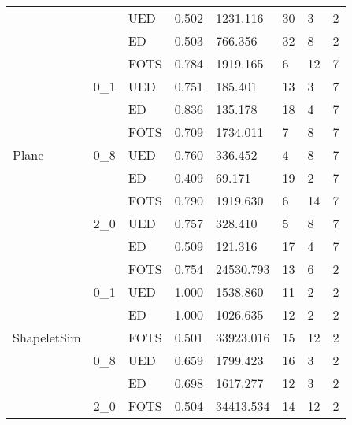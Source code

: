 \begin{tabular}{llllllll}
           &     & UED & 0.502 &  1231.116 &             30 &            3 &           2 \\
           &     & ED & 0.503 &   766.356 &             32 &            8 &           2 \\
\cline{1-8}
\cline{2-8}
\multirow{9}{*}{Plane} & \multirow{3}{*}{0\_1} & FOTS & 0.784 &  1919.165 &              6 &           12 &           7 \\
           &     & UED & 0.751 &   185.401 &             13 &            3 &           7 \\
           &     & ED & 0.836 &   135.178 &             18 &            4 &           7 \\
\cline{2-8}
           & \multirow{3}{*}{0\_8} & FOTS & 0.709 &  1734.011 &              7 &            8 &           7 \\
           &     & UED & 0.760 &   336.452 &              4 &            8 &           7 \\
           &     & ED & 0.409 &    69.171 &             19 &            2 &           7 \\
\cline{2-8}
           & \multirow{3}{*}{2\_0} & FOTS & 0.790 &  1919.630 &              6 &           14 &           7 \\
           &     & UED & 0.757 &   328.410 &              5 &            8 &           7 \\
           &     & ED & 0.509 &   121.316 &             17 &            4 &           7 \\
\cline{1-8}
\cline{2-8}
\multirow{9}{*}{ShapeletSim} & \multirow{3}{*}{0\_1} & FOTS & 0.754 & 24530.793 &             13 &            6 &           2 \\
           &     & UED & 1.000 &  1538.860 &             11 &            2 &           2 \\
           &     & ED & 1.000 &  1026.635 &             12 &            2 &           2 \\
\cline{2-8}
           & \multirow{3}{*}{0\_8} & FOTS & 0.501 & 33923.016 &             15 &           12 &           2 \\
           &     & UED & 0.659 &  1799.423 &             16 &            3 &           2 \\
           &     & ED & 0.698 &  1617.277 &             12 &            3 &           2 \\
\cline{2-8}
           & \multirow{3}{*}{2\_0} & FOTS & 0.504 & 34413.534 &             14 &           12 &           2 \\

\end{tabular}
